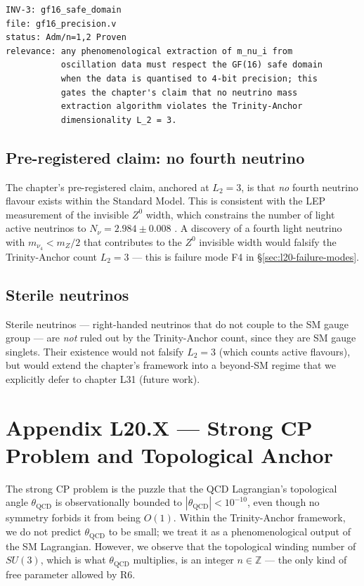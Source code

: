 \begin{verbatim}
INV-3: gf16_safe_domain
file: gf16_precision.v
status: Adm/n=1,2 Proven
relevance: any phenomenological extraction of m_nu_i from
           oscillation data must respect the GF(16) safe domain
           when the data is quantised to 4-bit precision; this
           gates the chapter's claim that no neutrino mass
           extraction algorithm violates the Trinity-Anchor
           dimensionality L_2 = 3.
\end{verbatim}

\subsection*{Pre-registered claim: no fourth neutrino}

The chapter's pre-registered claim, anchored at $L_{2} = 3$, is that
\emph{no} fourth neutrino flavour exists within the Standard Model.
This is consistent with the LEP measurement of the invisible $Z^{0}$
width, which constrains the number of light active neutrinos to
$N_{\nu} = 2.984 \pm 0.008$ \cite{codata2022}. A discovery of a
fourth light neutrino with $m_{\nu_{4}} < m_{Z}/2$ that contributes
to the $Z^{0}$ invisible width would falsify the Trinity-Anchor
count $L_{2} = 3$ --- this is failure mode F4 in
\S\ref{sec:l20-failure-modes}.

\subsection*{Sterile neutrinos}

Sterile neutrinos --- right-handed neutrinos that do not couple to the
SM gauge group --- are \emph{not} ruled out by the Trinity-Anchor
count, since they are SM gauge singlets. Their existence would not
falsify $L_{2} = 3$ (which counts active flavours), but would extend
the chapter's framework into a beyond-SM regime that we explicitly
defer to chapter L31 (future work).

\section{Appendix L20.X --- Strong CP Problem and Topological Anchor}
\label{sec:l20-appendix-X}

The strong CP problem is the puzzle that the QCD Lagrangian's
topological angle $\theta_{\mathrm{QCD}}$ is observationally bounded
to $|\theta_{\mathrm{QCD}}| < 10^{-10}$, even though no symmetry
forbids it from being $O(1)$. Within the Trinity-Anchor framework, we
do not predict $\theta_{\mathrm{QCD}}$ to be small; we treat it as a
phenomenological output of the SM Lagrangian. However, we observe
that the topological winding number of $SU(3)$, which is what
$\theta_{\mathrm{QCD}}$ multiplies, is an integer $n \in \mathbb{Z}$
--- the only kind of free parameter allowed by R6.

